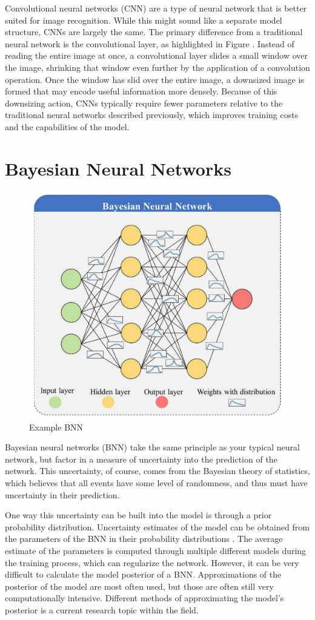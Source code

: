 \documentclass[12pt]{article}
\begin{document}
Convolutional neural networks (CNN) are a type of neural network that is better suited for image recognition. While this might sound like a separate model structure, CNNs are largely the same. The primary difference from a traditional neural network is the convolutional layer, as highlighted in Figure \cite{fig:cnn-pipeline}. Instead of reading the entire image at once, a convolutional layer slides a small window over the image, shrinking that window even further by the application of a convolution operation. Once the window has slid over the entire image, a downsized image is formed that may encode useful information more densely. Because of this downsizing action, CNNs typically require fewer parameters relative to the traditional neural networks described previously, which improves training costs and the capabilities of the model. 




\section{Bayesian Neural Networks}

\begin{figure}[H]
	\centering
	\includegraphics[width=.55\textwidth]{../Images/example_bnn.png}
	\caption{Example BNN  \cite{FleszarBNN}}
\end{figure}

Bayesian neural networks (BNN) take the same principle as your typical neural network, but factor in a measure of uncertainty into the prediction of the network. This uncertainty, of course, comes from the Bayesian theory of statistics, which believes that all events have some level of randomness, and thus must have uncertainty in their prediction. 

One way this uncertainty can be built into the model is through a prior probability distribution. Uncertainty estimates of the model can be obtained from the parameters of the BNN in their probability distributions \cite{shridhar2019comprehensive}. The average estimate of the parameters is computed through multiple different models during the training process, which can regularize the network. However, it can be very difficult to calculate the model posterior of a BNN. Approximations of the posterior of the model are most often used, but those are often still very computationally intensive. Different methods of approximating the model's posterior is a current research topic within the field.
\end{document}
